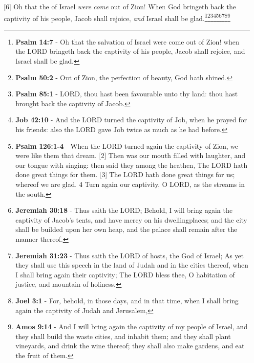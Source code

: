 [6] \textcolor[cmyk]{0.99998,1,0,0}{Oh that the  of Israel \emph{were} \emph{come} out of Zion! When God bringeth back the captivity of his people, Jacob shall rejoice, \emph{and} Israel shall be glad.}\footnote{\textbf{Psalm 14:7} - Oh that the salvation of Israel were come out of Zion! when the LORD bringeth back the captivity of his people, Jacob shall rejoice, and Israel shall be glad.}\footnote{\textbf{Psalm 50:2} - Out of Zion, the perfection of beauty, God hath shined.}\footnote{\textbf{Psalm 85:1} - LORD, thou hast been favourable unto thy land: thou hast brought back the captivity of Jacob.}\footnote{\textbf{Job 42:10} -  And the LORD turned the captivity of Job, when he prayed for his friends: also the LORD gave Job twice as much as he had before.}\footnote{\textbf{Psalm 126:1-4} - When the LORD turned again the captivity of Zion, we were like them that dream. [2] Then was our mouth filled with laughter, and our tongue with singing: then said they among the heathen, The LORD hath done great things for them. [3] The LORD hath done great things for us; whereof we are glad. 4 Turn again our captivity, O LORD, as the streams in the south. }\footnote{\textbf{Jeremiah 30:18} - Thus saith the LORD; Behold, I will bring again the captivity of Jacob's tents, and have mercy on his dwellingplaces; and the city shall be builded upon her own heap, and the palace shall remain after the manner thereof.}\footnote{\textbf{Jeremiah 31:23} - Thus saith the LORD of hosts, the God of Israel; As yet they shall use this speech in the land of Judah and in the cities thereof, when I shall bring again their captivity; The LORD bless thee, O habitation of justice, and mountain of holiness.}\footnote{\textbf{Joel 3:1} - For, behold, in those days, and in that time, when I shall bring again the captivity of Judah and Jerusalem,}\footnote{\textbf{Amos 9:14} - And I will bring again the captivity of my people of Israel, and they shall build the waste cities, and inhabit them; and they shall plant vineyards, and drink the wine thereof; they shall also make gardens, and eat the fruit of them.}



